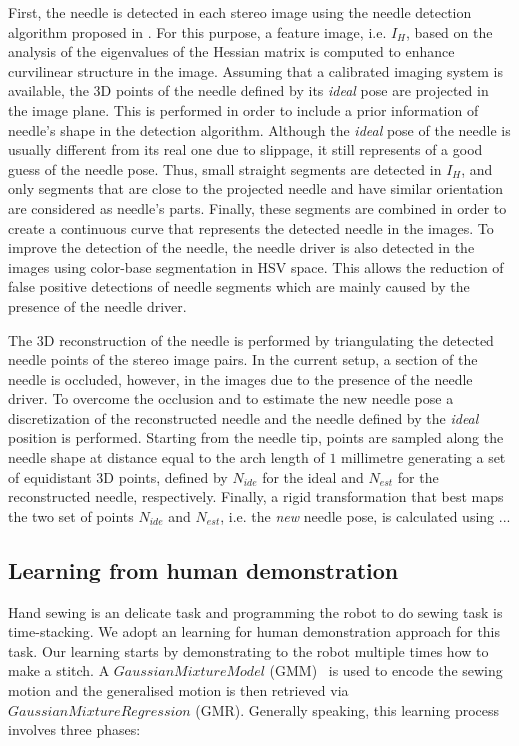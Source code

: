 First, the needle is detected in each stereo image using the needle detection algorithm proposed in \cite{hedy2015}. For this purpose, a feature image, i.e. $I_H$, based on the analysis of the eigenvalues of the Hessian matrix \cite{van2005guide} is computed to enhance curvilinear structure in the image. Assuming that a calibrated imaging system is available, the 3D points of the needle defined by its \emph{ideal} pose are projected in the image plane. This is performed in order to include a prior information of needle's shape in the detection algorithm. Although the \emph{ideal} pose of the needle is usually different from its real one due to slippage, it still represents of a good guess of the needle pose. Thus, small straight segments are detected in $I_H$, and only segments that are close to the projected needle and have similar orientation are considered as needle's parts. Finally, these segments are combined in order to create a continuous curve that represents the detected needle in the images. To improve the detection of the needle, the needle driver is also detected in the images using color-base segmentation in HSV space. This allows the reduction of false positive detections of needle segments which are mainly caused by the presence of the needle driver.

The 3D reconstruction of the needle is performed by triangulating the detected needle points of the stereo image pairs. In the current setup, a section of the needle is occluded, however, in the images due to the presence of the needle driver. To overcome the occlusion and to estimate the new needle pose a discretization of the reconstructed needle and the needle defined by the \emph{ideal} position is performed. Starting from the needle tip, points are sampled along the needle shape at distance equal to the arch length of $1$ millimetre generating a set of equidistant 3D points, defined by $N_{ide}$ for the ideal and $N_{est}$ for the reconstructed needle, respectively. Finally, a rigid transformation that best maps the two set of points $N_{ide}$ and $N_{est}$, i.e. the \emph{new} needle pose, is calculated using ...

\subsection{Learning from human demonstration}
Hand sewing is an delicate task and programming the robot to do sewing task is time-stacking. We adopt an learning for human demonstration approach for this task. Our learning starts by demonstrating to the robot multiple times how to make a stitch. A $Gaussian Mixture Model$ (GMM)~\cite{cohn1996active} is used to encode the sewing motion and the generalised motion is then retrieved via $Gaussian Mixture Regression$ (GMR). Generally speaking, this learning process involves three phases:

